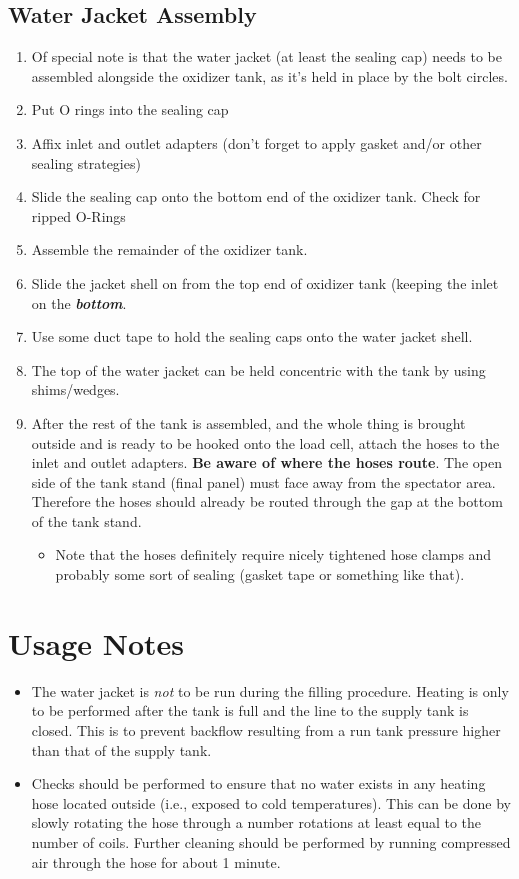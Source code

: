 \documentclass[11pt]{article}
\begin{document}
\subsection{Water Jacket Assembly}

\begin{enumerate}
	\item Of special note is that the water jacket (at least the sealing cap) needs to be assembled alongside the oxidizer tank, as it's held in place by the bolt circles.
	\item Put O rings into the sealing cap
	\item Affix inlet and outlet adapters (don't forget to apply gasket and/or other sealing strategies)
	\item Slide the sealing cap onto the bottom end of the oxidizer tank. Check for ripped O-Rings
	\item Assemble the remainder of the oxidizer tank.
	\item Slide the jacket shell on from the top end of oxidizer tank (keeping the inlet on the \textbf{\textit{bottom}}.
	\item Use some duct tape to hold the sealing caps onto the water jacket shell.
	\item The top of the water jacket can be held concentric with the tank by using shims/wedges.
	\item After the rest of the tank is assembled, and the whole thing is brought outside and is ready to be hooked onto the load cell, attach the hoses to the inlet and outlet adapters. \textbf{Be aware of where the hoses route}. The open side of the tank stand (final panel) must face away from the spectator area. Therefore the hoses should already be routed through the gap at the bottom of the tank stand.
		\begin{itemize}
			\item Note that the hoses definitely require nicely tightened hose clamps and probably some sort of sealing (gasket tape or something like that).
		\end{itemize}
\end{enumerate}

\section{Usage Notes}
\begin{itemize}
	\item The water jacket is \textit{not} to be run during the filling procedure. Heating is only to be performed after the tank is full and the line to the supply tank is closed. This is to prevent backflow resulting from a run tank pressure higher than that of the supply tank.
	\item Checks should be performed to ensure that no water exists in any heating hose located outside (i.e., exposed to cold temperatures). This can be done by slowly rotating the hose through a number rotations at least equal to the number of coils. Further cleaning should be performed by running compressed air through the hose for about 1 minute.
\end{itemize}
\end{document}
